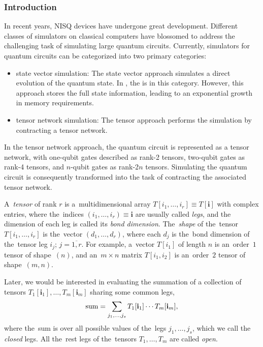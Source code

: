 \subsubsection{Introduction}
In recent years, NISQ devices have undergone great development. Different classes of simulators on classical computers have blossomed to address the challenging task of simulating large quantum circuits. Currently, simulators for quantum circuits can be categorized into two primary categories:
\begin{itemize}
    \item state vector simulation: The state vector approach simulates a direct evolution of the quantum state. In \MindQuantum, the  is in this category. However, this approach stores the full state information, leading to an exponential growth in memory requirements.
    \item tensor network simulation: The tensor approach performs the simulation by contracting a tensor network.
\end{itemize}

In the tensor network approach, the quantum circuit is represented as a tensor network, with one-qubit gates described as rank-2 tensors, two-qubit gates as rank-4 tensors, and $n$-qubit gates as rank-2$n$ tensors. Simulating the quantum circuit is consequently transformed into the task of contracting the associated tensor network.

A~\emph{tensor} of rank $r$ is a~multidimensional array $T[i_1,\dots,i_r] \equiv T[\mathbf{i}]$ with complex entries, where the~indices $(i_1,\dots,i_r) \equiv \mathbf{i}$ are usually called \emph{legs}, and the dimension of each leg is called its \emph{bond dimension}. The~\emph{shape} of the~tensor $T[i_1,\dots,i_r]$ is the~vector $(d_1,\dots,d_r)$, where each $d_j$ is the~bond dimension of the~tensor leg $i_j$;  $j=\overline{1,r}$. For example, a~vector $T[i_1]$ of length $n$ is an~order~$1$ tensor of shape~$(n)$, and an~$m\times n$ matrix $T[i_1,i_2]$ is an~order~$2$ tensor of shape~$(m, n)$.

Later, we would be interested in evaluating the summation of a collection of tensors $T_1[\mathbf{i}_1],\dots, T_m[\mathbf{i}_m]$ sharing some common legs,
\begin{equation}\label{eq:sum}
    {\rm{sum}}=\sum_{j_1,\dots,j_s} T_1[\mathbf{i}_1]\cdots T_m[\mathbf{i}_m],
\end{equation}
where the~sum is over all possible values of the~legs $j_1,\dots,j_s$, which we call the \emph{closed} legs. All the~rest legs of the~tensors $T_1,\dots,T_m$ are called \emph{open}.

